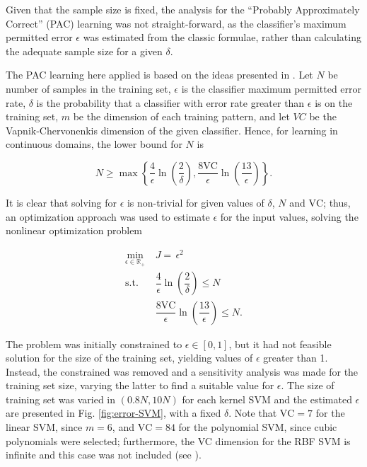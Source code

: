 \documentclass[conference]{IEEEtran}
\theoremstyle{definition}
\theoremstyle{remark}
\theoremstyle{remark}
\begin{document}
Given that the sample size is fixed, the analysis for the ``Probably
Approximately Correct'' (PAC) learning was not straight-forward, as the
classifier's maximum permitted error $\epsilon$ was estimated from the classic
formulae, rather than calculating the adequate sample size for a given $\delta$.

The PAC learning here applied is based on the ideas presented in
\parencite{kubat2017}. Let $N$ be number of samples in the training set,
$\epsilon$ is the classifier maximum permitted error rate, $\delta$ is the
probability that a classifier with error rate greater than $\epsilon$ is
 on the training set, $m$ be the dimension of each training
pattern, and let $VC$ be the Vapnik-Chervonenkis dimension of the given
classifier. Hence, for learning in continuous domains, the lower bound for $N$
is

\begin{equation}
  N\geq \max\left\{ \dfrac{4}{\epsilon}\ln\left(\dfrac{2}{\delta}\right),
    \dfrac{8\mathrm{VC}}{\epsilon}\ln\left(\dfrac{13}{\epsilon}\right) \right\}.
\end{equation}

It is clear that solving for $\epsilon$ is non-trivial for given values of
$\delta$, $N$ and $\mathrm{VC}$; thus, an optimization approach was used to
estimate $\epsilon$ for the input values, solving the nonlinear optimization
problem

\begin{equation}
  \begin{split}
    \min_{\epsilon\in\mathbb{R}_+}\ &J=\,\epsilon^2\\
    \mathrm{s.t.}\ &\dfrac{4}{\epsilon}\ln\left(\dfrac{2}{\delta} \right)\leq N\\
    \quad&\dfrac{8\mathrm{VC}}{\epsilon}\ln\left(\dfrac{13}{\epsilon}\right)\leq N.
  \end{split}
\end{equation}

The problem was initially constrained to $\epsilon\in[0,1]$, but it had not
feasible solution for the size of the training set, yielding values of
$\epsilon$ greater than 1. Instead, the constrained was removed and a
sensitivity analysis was made for the training set size, varying the latter to
find a suitable value for $\epsilon$. The size of training set was varied in
$(0.8N, 10N)$ for each kernel SVM and the estimated $\epsilon$ are presented in
Fig. \ref{fig:error-SVM}, with a fixed $\delta$. Note that $\mathrm{VC}=7$ for
the linear SVM, since $m=6$, and $\mathrm{VC}=84$ for the polynomial SVM, since
cubic polynomials were selected; furthermore, the VC dimension for the RBF SVM
is infinite and this case was not included (see \parencite{burges1998}).
\end{document}
